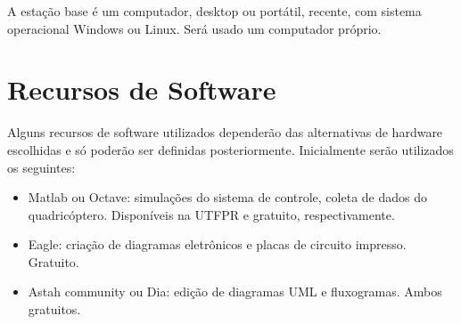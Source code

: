 A estação base é um computador, desktop ou portátil, recente, com sistema operacional Windows ou Linux. Será usado um computador próprio.


\section{Recursos de Software}

Alguns recursos de software utilizados dependerão das alternativas de hardware escolhidas e só poderão ser definidas posteriormente. Inicialmente serão utilizados os seguintes:

\begin{itemize}
\item Matlab ou Octave: simulações do sistema de controle, coleta de dados do quadricóptero. Disponíveis na UTFPR e gratuito, respectivamente.
\item Eagle: criação de diagramas eletrônicos e placas de circuito impresso. Gratuito.
\item Astah community ou Dia: edição de diagramas UML e fluxogramas. Ambos gratuitos.
\end{itemize}






